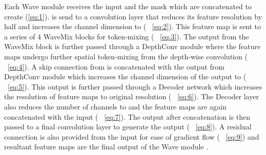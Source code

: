 \documentclass{article}
\begin{document}
Each Wave module receives the input  and the mask  which are concatenated to create  (\ref{eq:1}).  is send to a convolution layer  that reduces its feature resolution  by half and increases the channel dimension to  ( ~\ref{eq:2}). This feature map  is sent to a series of 4 WaveMix blocks for token-mixing ( ~\ref{eq:3}). The output from the WaveMix block  is further passed through a DepthConv module where the feature maps undergo further spatial token-mixing from the depth-wise convolution ( ~\ref{eq:4}). A skip connection from  is concatenated with the output from DepthConv module  which increases the channel dimension of the output  to  ( ~\ref{eq:5}). This output is further passed through a Decoder network which increases the resolution of feature maps to original resolution ( ~\ref{eq:6}). The Decoder layer also reduces the number of channels to  and the feature maps  are again concatenated with the input  ( ~\ref{eq:7}). The output after concatenation  is then passed to a final convolution layer  to generate the output  ( ~\ref{eq:8}). A residual connection is also provided from the input for ease of gradient flow ( ~\ref{eq:9}) and resultant feature maps are the final output of the Wave module . 
\end{document}
